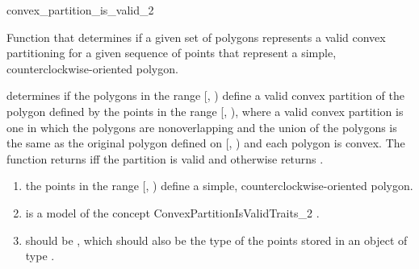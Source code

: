 \renewcommand\ccRefPageBegin{\ccParDims\cgalColumnLayout\begin{ccAdvanced}}
\renewcommand\ccRefPageEnd{\ccParDims\cgalColumnLayout\end{ccAdvanced}}
\begin{ccRefFunction}{convex_partition_is_valid_2}

\ccDefinition
Function that determines if a given set of polygons represents
a valid convex partitioning for a given sequence of points that represent a
simple, counterclockwise-oriented polygon.  


{
determines if the polygons in the range [, )
define a valid convex partition of the polygon defined by the points in the 
range [, ), where a valid convex partition 
is one in which the polygons are nonoverlapping and the union of the polygons 
is the same as the original polygon defined on [, 
) and each polygon is convex.
The function returns  iff the partition is valid and otherwise
returns .
}

\begin{enumerate}
    \item the points in the range [, ) define
          a simple, counterclockwise-oriented polygon.
    \item {} is a model of the concept
          ConvexPartitionIsValidTraits\_2%
          .
    \item {} should be ,
          which should also be the type of the points stored in an object
          of type .
\end{enumerate}


\end{ccRefFunction}
